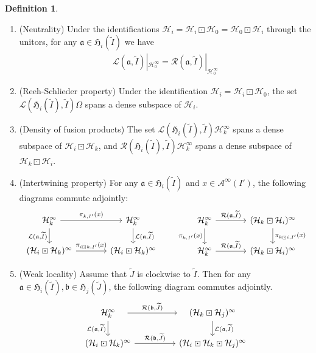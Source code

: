 \documentclass[11pt,b5paper,notitlepage]{article}
\theoremstyle{definition}
\newtheorem{df}{Definition}[section]
\theoremstyle{plain}
\newcommand{\fk}{\mathfrak}
\newcommand{\mc}{\mathcal}
\newcommand{\wtd}{\widetilde}
\numberwithin{equation}{section}
\begin{document}
\begin{df}
\begin{enumerate}[label=(\alph*)]
\item (Neutrality) Under the identifications $\mc H_i=\mc H_i\boxdot\mc H_0=\mc H_0\boxdot\mc H_i$ through the unitors, for any $\fk a\in\fk H_i(\wtd I)$ we have
	\begin{align}
	\mc L(\fk a,\wtd I)|_{\mc H_0^\infty}=\mc R(\fk a,\wtd I)|_{\mc H_0^\infty}
	\end{align}
	
\item (Reeh-Schlieder property) Under the identification $\mc H_i=\mc H_i\boxdot\mc H_0$, the set $\mc L(\fk H_i(\wtd I),\wtd I)\Omega$ spans a dense subspace of $\mc H_i$.
	
\item (Density of fusion products) The set $\mc L(\fk H_i(\wtd I),\wtd I)\mc H_k^\infty$ spans a dense subspace of $\mc H_i\boxdot\mc H_k$, and $\mc R(\fk H_i(\wtd I),\wtd I)\mc H_k^\infty$ spans a dense subspace of $\mc H_k\boxdot\mc H_i$.
	
\item (Intertwining property) 	For any $\fk a\in\fk H_i(\wtd I)$ and $x\in\mc A^\infty(I')$, the following diagrams commute adjointly:
\begin{equation}\label{eq18}
\begin{tikzcd}[column sep=large]
\mc H_k^\infty \arrow[d,"{\mc L(\fk a,\wtd I)}"'] \arrow[r,"{\pi_{k,I'}(x)}"] & \mc H_k^\infty \arrow[d,"{\mc L(\fk a,\wtd I)}"] \\
(\mc H_i\boxdot\mc H_k)^\infty \arrow[r,"{\pi_{i\boxdot k,I'}(x)}"]           & (\mc H_i\boxdot\mc H_k)^\infty          
\end{tikzcd}
\qquad
\begin{tikzcd}[column sep=large]
\mc H_k^\infty \arrow[r,"{\mc R(\fk a,\wtd I)}"] \arrow[d,"{\pi_{k,I'}(x)}"'] & (\mc H_k\boxdot\mc H_i)^\infty \arrow[d,"{\pi_{k\boxdot i,I'}(x)}"] \\
\mc H_k^\infty \arrow[r,"{\mc R(\fk a,\wtd I)}"]           & (\mc H_k\boxdot\mc H_i)^\infty        
\end{tikzcd}
\end{equation}
	
	

\item (Weak locality) Assume that $\wtd J$ is clockwise to $\wtd I$. Then for  any $\fk a\in\fk H_i(\wtd I),\fk b\in\fk H_j(\wtd J)$, the following diagram   commutes adjointly.
\begin{equation}
\begin{tikzcd}[column sep=huge]
\quad \mc H_k^\infty\quad \arrow[r,"{\mc R(\fk b,\wtd J)}"] \arrow[d, "{\mc L(\fk a,\wtd I)}"'] &\quad (\mc H_k\boxdot\mc H_j)^\infty\quad \arrow[d, "{\mc L(\fk a,\wtd I)}"]\\
(\mc H_i\boxdot\mc H_k)^\infty\arrow[r,"{\mc R(\fk b,\wtd J)}"] &(\mc H_i\boxdot\mc H_k\boxdot\mc H_j)^\infty
\end{tikzcd}
\end{equation}
	

\end{enumerate}
\end{df}
\end{document}
